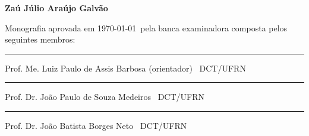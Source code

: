 
%
%
%
%

\begin{titlepage}

\begin{center}

\LARGE

\textbf{\titulo}

\vfill

\Large

\textbf{Zaú Júlio Araújo Galvão}

\end{center}

\vfill

\noindent

Monografia aprovada em \today\ pela banca examinadora composta pelos
seguintes membros:

\begin{center}

\vspace{1.5cm}\rule{0.95\linewidth}{1pt}
\parbox{0.9\linewidth}{%
Prof. Me. Luiz Paulo de Assis Barbosa (orientador) \dotfill\ DCT/UFRN}

\vspace{1.5cm}\rule{0.95\linewidth}{1pt}
\parbox{0.9\linewidth}{%
Prof. Dr. João Paulo de Souza Medeiros \dotfill\ DCT/UFRN}

\vspace{1.5cm}\rule{0.95\linewidth}{1pt}
\parbox{0.9\linewidth}{%
Prof. Dr. João Batista Borges Neto \dotfill\ DCT/UFRN}

\end{center}

\end{titlepage}
